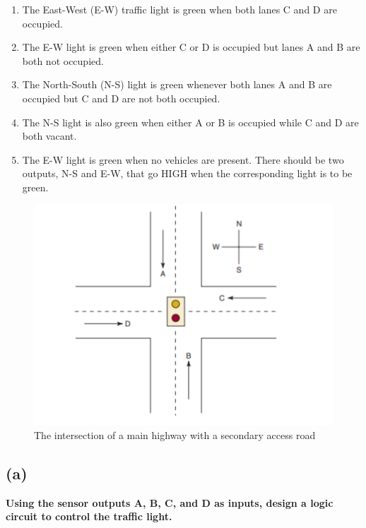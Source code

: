 \documentclass[a4paper,12]{article}
\begin{document}
\begin{enumerate}
\item The East-West (E-W) traffic light is green when both lanes C and D are occupied.
\item The E-W light is green when either C or D is occupied but lanes A and B are both not occupied.
\item The North-South (N-S) light is green whenever both lanes A and B are occupied but C and D are not both occupied.
\item The N-S light is also green when either A or B is occupied while C and D are both vacant.
\item The E-W light is green when no vehicles are present.
There should be two outputs, N-S and E-W, that go HIGH when the corresponding light is to be green.
\end{enumerate}

\begin{figure}[H]
    \centering
    \includegraphics[width=0.6\linewidth]{q1.png}
    \caption{The intersection of a main highway with a secondary access road}
    \label{fig:q1}
\end{figure}

\subsection*{(a)} \textbf{ Using the sensor outputs A, B, C, and D as inputs, design a logic circuit to
control the traffic light.}
\end{document}
